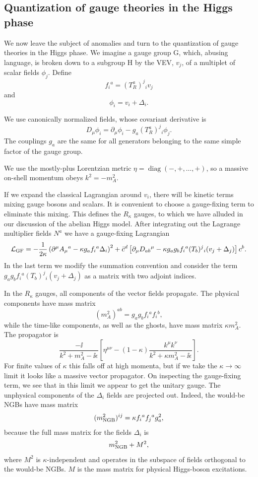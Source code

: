 \subsection{Quantization of gauge theories in the Higgs phase}

We now leave the subject of anomalies and turn to the quantization of gauge
theories in the Higgs phase. We imagine a gauge group G, which, abusing
language, is broken down to a subgroup H by the VEV, $v_j$, of a multiplet of
scalar fields $\phi_j$. Define
\[
  f_i{}^a=(T_R^a)^j{}_i v_j
\]
and
\[
  \phi_i=v_i+\Delta_i .
\]

We use canonically normalized fields, whose covariant derivative is
\[
  D_\mu\phi_i=\partial_\mu\phi_i-g_a(T_R^a)^j{}_i\phi_j .
\]
The couplings $g_a$ are the same for all generators belonging to the same
simple factor of the gauge group.

We use the mostly-plus Lorentzian metric $\eta=\operatorname{diag}(-,+,\ldots,+)$,
so a massive on-shell momentum obeys $k^2=-m_A^2$.

If we expand the classical Lagrangian around $v_i$, there will be kinetic
terms mixing gauge bosons and scalars. It is convenient to choose a
gauge-fixing term to eliminate this mixing. This defines the $R_\kappa$
gauges, to which we have alluded in our discussion of the abelian Higgs
model. After integrating out the Lagrange multiplier fields $N^a$ we have a
gauge-fixing Lagrangian
\[
  \mathcal L_{\rm GF}=-\frac{1}{2\kappa}
  \left(\partial^\mu A_\mu{}^a-\kappa g_af_i{}^a\Delta_i\right)^2
  +\bar c^d\left[\partial_\mu D_{ab}{}^{\mu}
  -\kappa g_ag_bf_i{}^a(T_b)^j{}_i(v_j+\Delta_j)\right]c^b .
\]
In the last term we modify the summation convention and consider the term
$g_ag_bf_i{}^a(T_b)^j{}_i(v_j+\Delta_j)$ as a matrix with two adjoint indices.

In the $R_\kappa$ gauges, all components of the vector fields propagate. The
physical components have mass matrix
\[
  (m_A^2)^{ab}=g_ag_bf_i{}^af_i{}^b,
\]
while the time-like components, as well as the ghosts, have mass matrix
$\kappa m_A^2$. The propagator is
\[
  \frac{-\ii}{k^2+m_A^2-\ii\epsilon}
  \left[\eta^{\mu\nu}-(1-\kappa)\frac{k^\mu k^\nu}
  {k^2+\kappa m_A^2-\ii\epsilon}\right] .
\]
For finite values of $\kappa$ this falls off at high momenta, but if we take
the $\kappa\to\infty$ limit it looks like a massive vector propagator. On
inspecting the gauge-fixing term, we see that in this limit we appear to get
the unitary gauge. The unphysical components of the $\Delta_i$ fields are
projected out. Indeed, the would-be NGBs have mass matrix
\[
  (m_{\rm NGB}^2)^{ij}=\kappa f_i{}^af_j{}^ag_a^2,
\]
because the full mass matrix for the fields $\Delta_i$ is
\[
  m_{\rm NGB}^2+M^2,
\]
where $M^2$ is $\kappa$-independent and operates in the subspace of fields
orthogonal to the would-be NGBs. $M$ is the mass matrix for physical
Higgs-boson excitations.

